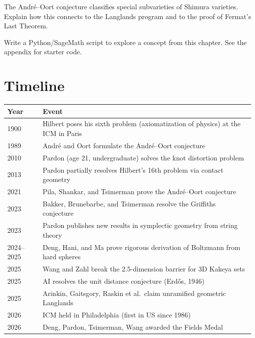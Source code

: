 \begin{exercise}[Challenge]
The Andr\'e--Oort conjecture classifies special subvarieties of Shimura varieties. Explain how this connects to the Langlands program and to the proof of Fermat's Last Theorem.
\end{exercise}

\begin{exercise}[Computational]
Write a Python/SageMath script to explore a concept from this chapter. See the appendix for starter code.
\end{exercise}

\section{Timeline}

\begin{tabularx}{\linewidth}{lX}
\toprule
\textbf{Year} & \textbf{Event} \\ \midrule
1900 & Hilbert poses his sixth problem (axiomatization of physics) at the ICM in Paris \\
1989 & Andr\'e and Oort formulate the Andr\'e--Oort conjecture \\
2010 & Pardon (age 21, undergraduate) solves the knot distortion problem \\
2013 & Pardon partially resolves Hilbert's 16th problem via contact geometry \\
2021 & Pila, Shankar, and Tsimerman prove the Andr\'e--Oort conjecture \\
2023 & Bakker, Brunebarbe, and Tsimerman resolve the Griffiths conjecture \\
2023 & Pardon publishes new results in symplectic geometry from string theory \\
2024--2025 & Deng, Hani, and Ma prove rigorous derivation of Boltzmann from hard spheres \\
2025 & Wang and Zahl break the 2.5-dimension barrier for 3D Kakeya sets \\
2025 & AI resolves the unit distance conjecture (Erd\H{o}s, 1946) \\
2025 & Arinkin, Gaitsgory, Raskin et al.\ claim unramified geometric Langlands \\
2026 & ICM held in Philadelphia (first in US since 1986) \\
2026 & Deng, Pardon, Tsimerman, Wang awarded the Fields Medal \\ \bottomrule
\end{tabularx}

